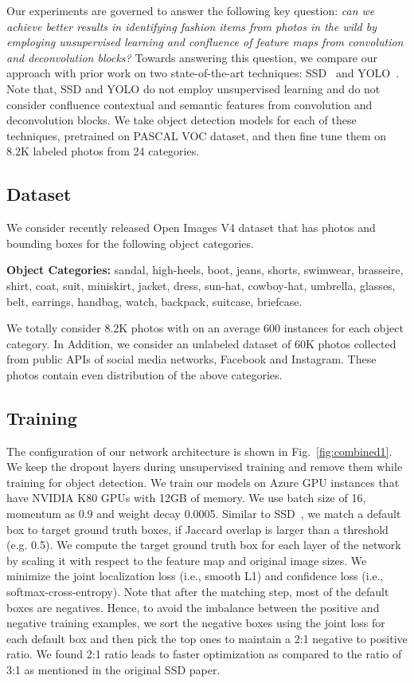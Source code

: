 \documentclass[sigconf]{acmart}
\begin{document}
Our experiments are governed to answer 
the following key question:
{\it can we achieve better results in identifying fashion items
from photos in the wild by employing unsupervised learning and confluence of feature maps
from convolution and deconvolution blocks?}
Towards answering this question,
we compare our approach with prior work
on two state-of-the-art techniques: SSD~\cite{LiuAESRFB16} 
and YOLO~\cite{RedmonCVPR16}.
Note that, SSD and YOLO do not employ unsupervised learning
and do not consider confluence contextual and semantic features
from convolution and deconvolution blocks.
We take object detection models for each of these techniques, pretrained
on PASCAL VOC dataset, and then fine tune them on 8.2K labeled photos
from 24 categories.

\subsection{Dataset}

We consider recently released Open Images V4
dataset that has photos and bounding boxes
for the following object categories.

\textbf{Object Categories:}
sandal,
high-heels,
boot,
jeans,
shorts,
swimwear,
brasseire,
shirt,
coat,
suit,
miniskirt,
jacket,
dress,
sun-hat,
cowboy-hat,
umbrella,
glasses,
belt,
earrings,
handbag,
watch,
backpack,
suitcase,
briefcase.

We totally consider 8.2K photos with on an average
600 instances for each object category.
In Addition, we consider an unlabeled dataset of 60K photos
collected from public APIs of social media networks,
Facebook and Instagram.
These photos contain even distribution of the above
categories.

\subsection{Training}
The configuration of our network architecture
is shown in Fig.~\ref{fig:combined1}.
We keep the dropout layers during unsupervised training
and remove them while training for object detection.
We train our models on Azure GPU instances that have
NVIDIA K80 GPUs with 12GB of memory.
We use batch size of 16,
momentum as 0.9 and weight decay 0.0005.
Similar to SSD~\cite{LiuAESRFB16},
we  match  a default  box  to target  ground truth boxes, 
if Jaccard overlap is larger than a threshold (e.g. 0.5).
We compute the target ground truth box for each layer of the network
by scaling it with respect to the feature map and original image sizes.
We minimize the joint localization loss (i.e., smooth L1) 
and confidence loss (i.e., softmax-cross-entropy).  
Note that after the matching step,
most of the default boxes are negatives. 
Hence, to avoid the imbalance between the positive and negative training examples,
we sort the negative boxes using the joint loss for each default box and 
then pick the top ones to maintain a 2:1 negative to positive ratio.
We found 2:1 ratio leads to faster optimization
as compared to the ratio of 3:1 as mentioned in the original SSD paper.
\end{document}
